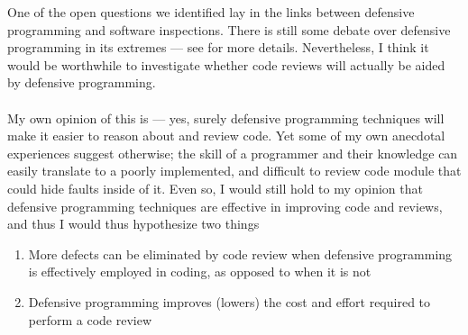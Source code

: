 One of the open questions we identified lay in the links between defensive programming and software
inspections.
There is still some debate over defensive programming in its extremes --- see \FIXME for more
details.
Nevertheless, I think it would be worthwhile to investigate whether code reviews will actually be
aided by defensive programming.\\
\\
My own opinion of this is --- yes, surely defensive programming techniques will make it easier to
reason about and review code.
Yet some of my own anecdotal experiences suggest otherwise; the skill of a programmer and their
knowledge can easily translate to a poorly implemented, and difficult to review code module that
could hide faults inside of it.
Even so, I would still hold to my opinion that defensive programming techniques are effective in
improving code and reviews, and thus I would thus hypothesize two things
\begin{enumerate}
	\item More defects can be eliminated by code review when defensive programming is effectively employed in coding,
		as opposed to when it is not
	\item Defensive programming improves (lowers) the cost and effort required to perform a code review
\end{enumerate}


